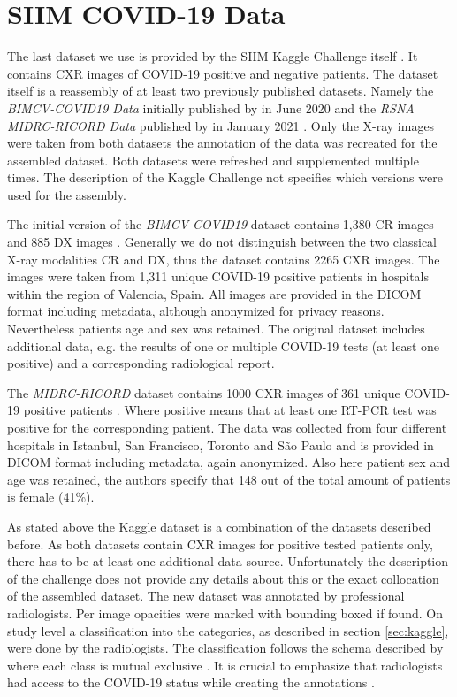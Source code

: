 \section{SIIM COVID-19 Data}\label{data:siim}

The last dataset we use is provided by the SIIM Kaggle Challenge itself \autocite{SIIMKaggle}. It contains \ac{CXR} images of COVID-19 positive and negative patients. The dataset itself is a reassembly of at least two previously published datasets. Namely the \textit{BIMCV-COVID19 Data} initially published by \citeauthor{vaya2020bimcv} in June 2020 \autocite{vaya2020bimcv} and the \textit{RSNA MIDRC-RICORD Data} published by \citeauthor{tsai2021rsna} in January 2021 \autocite{tsai2021rsna}. Only the X-ray images were taken from both datasets the annotation of the data was recreated for the assembled dataset. Both datasets were refreshed and supplemented multiple times. The description of the Kaggle Challenge not specifies which versions were used for the assembly.

The initial version of the \textit{BIMCV-COVID19} dataset contains 1,380 CR images and 885 DX images \autocite{vaya2020bimcv}. Generally we do not distinguish between the two classical X-ray modalities CR and DX, thus the dataset contains 2265 CXR images. The images were taken from 1,311 unique COVID-19 positive patients in hospitals within the region of Valencia, Spain. All images are provided in the DICOM format including metadata, although anonymized for privacy reasons. Nevertheless patients age and sex was retained. The original dataset includes additional data, e.g. the results of one or multiple COVID-19 tests (at least one positive) and a corresponding radiological report.

The \textit{MIDRC-RICORD} dataset contains 1000 CXR images of 361 unique COVID-19 positive patients \autocite{tsai2021rsna}. Where positive means that at least one \ac{RT-PCR} test was positive for the corresponding patient. The data was collected from four different hospitals in Istanbul, San Francisco, Toronto and São Paulo and is provided in DICOM format including metadata, again anonymized. Also here patient sex and age was retained, the authors specify that 148 out of the total amount of patients is female (41\%).

As stated above the Kaggle dataset is a combination of the datasets described before. As both datasets contain CXR images for positive tested patients only, there has to be at least one additional data source. Unfortunately the description of the challenge does not provide any details about this or the exact collocation of the assembled dataset. The new dataset was annotated by professional radiologists. Per image opacities were marked with bounding boxed if found. On study level a classification into the categories, as described in section \ref{sec:kaggle}, were done by the radiologists. The classification follows the schema described by \citeauthor{litmanovich2020review} where each class is mutual exclusive \autocite{litmanovich2020review}. It is crucial to emphasize that radiologists had access to the COVID-19 status while creating the annotations \autocite{SIIMKaggleAnnotation}.

